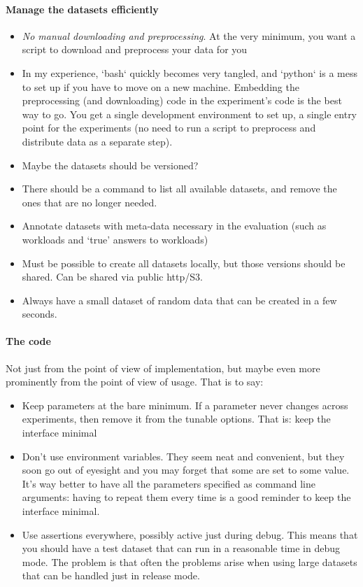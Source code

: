 \documentclass{llncs}
\begin{document}
\paragraph{Manage the datasets efficiently}

\begin{itemize}
\item \emph{No manual downloading and preprocessing}. At the very minimum, you want a
  script to download and preprocess your data for you
\item In my experience, `bash` quickly becomes very tangled, and `python` is a mess
  to set up if you have to move on a new machine. Embedding the preprocessing
  (and downloading) code in the experiment's code is the best way to go. You
  get a single development environment to set up, a single entry point for the
  experiments (no need to run a script to preprocess and distribute data as a
  separate step).
\item Maybe the datasets should be versioned?
\item There should be a command to list all available datasets, and remove the ones
  that are no longer needed.
\item Annotate datasets with meta-data necessary in the evaluation (such as workloads and `true' answers to workloads) 
\item Must be possible to create all datasets locally, but those versions should be shared. Can be shared via public http/S3.
\item Always have a small dataset of random data that can be created in a few seconds.
\end{itemize}

\paragraph{The code}

Not just from the point of view of implementation, but maybe even more
prominently from the point of view of usage. That is to say:

\begin{itemize}
\item Keep parameters at the bare minimum. If a parameter never changes across
  experiments, then remove it from the tunable options. That is: keep the
  interface minimal
\item Don't use environment variables. They seem neat and convenient, but they soon
  go out of eyesight and you may forget that some are set to some value. It's
  way better to have all the parameters specified as command line arguments:
  having to repeat them every time is a good reminder to keep the interface
  minimal.
\item Use assertions everywhere, possibly active just during debug. This means that
  you should have a test dataset that can run in a reasonable time in debug
  mode. The problem is that often the problems arise when using large datasets
  that can be handled just in release mode.
\end{itemize}
\end{document}
